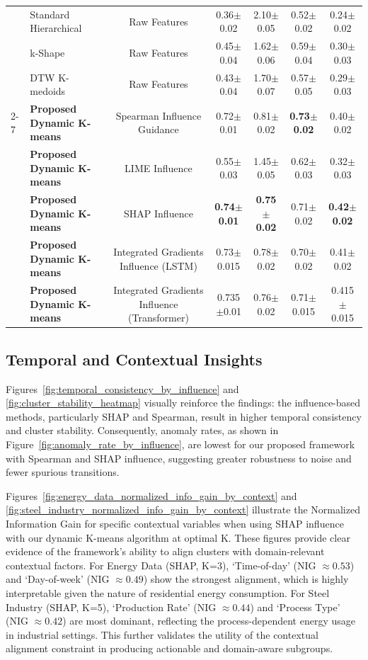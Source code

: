 \documentclass[final,authoryear,3p,times,review,sort&compress]{elsarticle}
\begin{document}
\begin{table}[t!]
{\begin{tabular}{@{}llccccc@{}}
 & Standard Hierarchical & Raw Features & 0.36$\pm$0.02 & 2.10$\pm$0.05 & 0.52$\pm$0.02 & 0.24$\pm$0.02 \\
 & k-Shape & Raw Features & 0.45$\pm$0.04 & 1.62$\pm$0.06 & 0.59$\pm$0.04 & 0.30$\pm$0.03 \\
 & DTW K-medoids & Raw Features & 0.43$\pm$0.04 & 1.70$\pm$0.07 & 0.57$\pm$0.05 & 0.29$\pm$0.03 \\ \cmidrule(lr){2-7}
 & \textbf{Proposed Dynamic K-means} & Spearman Influence Guidance & 0.72$\pm$0.01 & 0.81$\pm$0.02 & \textbf{0.73$\pm$0.02} & 0.40$\pm$0.02 \\
 & \textbf{Proposed Dynamic K-means} & LIME Influence & 0.55$\pm$0.03 & 1.45$\pm$0.05 & 0.62$\pm$0.03 & 0.32$\pm$0.03 \\
 & \textbf{Proposed Dynamic K-means} & SHAP Influence & \textbf{0.74$\pm$0.01} & \textbf{0.75$\pm$0.02} & 0.71$\pm$0.02 & \textbf{0.42$\pm$0.02} \\
 & \textbf{Proposed Dynamic K-means} & Integrated Gradients Influence (LSTM) & 0.73$\pm$0.015 & 0.78$\pm$0.02 & 0.70$\pm$0.02 & 0.41$\pm$0.02 \\
 & \textbf{Proposed Dynamic K-means} & Integrated Gradients Influence (Transformer) & 0.735$\pm$0.01 & 0.76$\pm$0.02 & 0.71$\pm$0.015 & 0.415$\pm$0.015 \\ \bottomrule
\end{tabular}
}
\end{table}

\subsection{Temporal and Contextual Insights}
Figures~\ref{fig:temporal_consistency_by_influence} and \ref{fig:cluster_stability_heatmap} visually reinforce the findings: the influence-based methods, particularly SHAP and Spearman, result in higher temporal consistency and cluster stability. Consequently, anomaly rates, as shown in Figure~\ref{fig:anomaly_rate_by_influence}, are lowest for our proposed framework with Spearman and SHAP influence, suggesting greater robustness to noise and fewer spurious transitions.

Figures~\ref{fig:energy_data_normalized_info_gain_by_context} and \ref{fig:steel_industry_normalized_info_gain_by_context} illustrate the Normalized Information Gain for specific contextual variables when using SHAP influence with our dynamic K-means algorithm at optimal K. These figures provide clear evidence of the framework's ability to align clusters with domain-relevant contextual factors. For Energy Data (SHAP, K=3), `Time-of-day' (NIG $\approx 0.53$) and `Day-of-week' (NIG $\approx 0.49$) show the strongest alignment, which is highly interpretable given the nature of residential energy consumption. For Steel Industry (SHAP, K=5), `Production Rate' (NIG $\approx 0.44$) and `Process Type' (NIG $\approx 0.42$) are most dominant, reflecting the process-dependent energy usage in industrial settings. This further validates the utility of the contextual alignment constraint in producing actionable and domain-aware subgroups.
\end{document}
